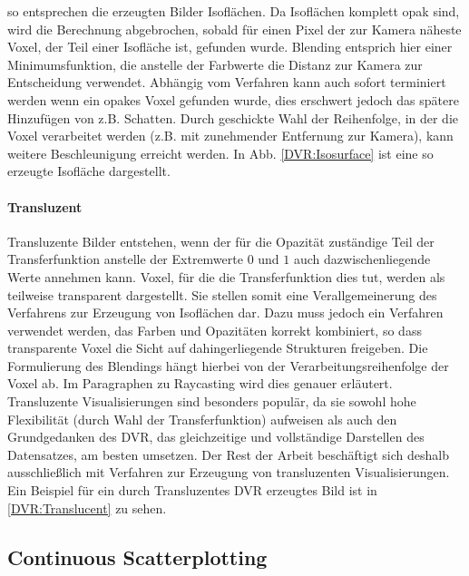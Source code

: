 \documentclass[a4paper,fontsize=12pt,toc=bib,halfparskip]{scrartcl}
\begin{document}
so entsprechen die erzeugten Bilder Isofl\"achen. Da Isofl\"achen komplett opak sind, wird die Berechnung abgebrochen, sobald f\"ur einen Pixel der zur Kamera n\"aheste Voxel, der Teil einer Isofl\"ache ist, gefunden wurde. Blending entsprich hier einer Minimumsfunktion, die anstelle der Farbwerte die Distanz zur Kamera zur Entscheidung verwendet. Abh\"angig vom Verfahren kann auch sofort terminiert werden wenn ein opakes Voxel gefunden wurde, dies erschwert jedoch das sp\"atere Hinzuf\"ugen von z.B. Schatten. Durch geschickte Wahl der Reihenfolge, in der die Voxel verarbeitet werden (z.B. mit zunehmender Entfernung zur Kamera), kann weitere Beschleunigung erreicht werden. In Abb. \ref{DVR:Isosurface} ist eine so erzeugte Isofl\"ache dargestellt.

\paragraph{Transluzent}
Transluzente Bilder entstehen, wenn der f\"ur die Opazit\"at zust\"andige Teil der Transferfunktion anstelle der Extremwerte $0$ und $1$ auch dazwischenliegende Werte annehmen kann. Voxel, f\"ur die die Transferfunktion dies tut, werden als teilweise transparent dargestellt. Sie stellen somit eine Verallgemeinerung des Verfahrens zur Erzeugung von Isofl\"achen dar. Dazu muss jedoch ein Verfahren verwendet werden, das Farben und Opazit\"aten korrekt kombiniert, so dass transparente Voxel die Sicht auf dahingerliegende Strukturen freigeben. Die Formulierung des Blendings h\"angt hierbei von der Verarbeitungsreihenfolge der Voxel ab. Im Paragraphen zu Raycasting wird dies genauer erl\"autert. Transluzente Visualisierungen sind besonders popul\"ar, da sie sowohl hohe Flexibilit\"at (durch Wahl der Transferfunktion) aufweisen als auch den Grundgedanken des DVR, das gleichzeitige und vollst\"andige Darstellen des Datensatzes, am besten umsetzen. Der Rest der Arbeit besch\"aftigt sich deshalb ausschlie{\ss}lich mit Verfahren zur Erzeugung von transluzenten Visualisierungen. Ein Beispiel f\"ur ein durch Transluzentes DVR erzeugtes Bild ist in \ref{DVR:Translucent} zu sehen. 

\subsection{Continuous Scatterplotting}
\end{document}
